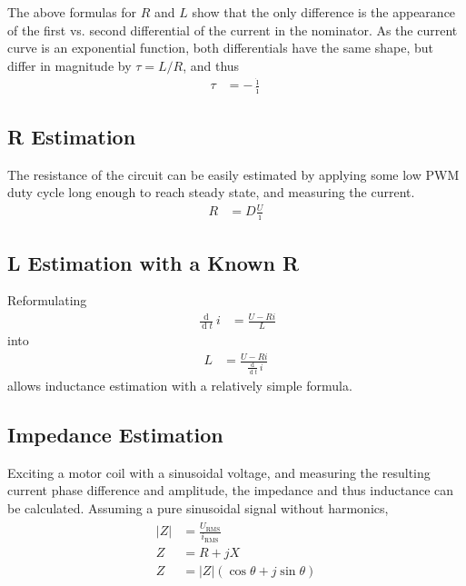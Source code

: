 \documentclass[12pt,a4paper,oneside,openany]{article}
\DeclareMathOperator{\ud}{d}
\begin{document}
The above formulas for $R$ and $L$ show that the only difference is the appearance of the first vs. second differential of the current in the nominator. As the current curve is an exponential function, both differentials have the same shape, but differ in magnitude by $\tau=L/R$, and thus 
\begin{align}
\tau &= - \frac{\dot{\imath}}{\ddot{\imath}}
\end{align}

\subsection{R Estimation}

The resistance of the circuit can be easily estimated by applying some low PWM duty cycle long enough to reach steady state, and measuring the current.
\begin{align}
R &= D\frac{U}{\imath}
\end{align}

\subsection{L Estimation with a Known R}

Reformulating
\begin{align}
\frac{\ud}{\ud t} i &= \frac{U - R i}{L}
\end{align}
into
\begin{align}
L &= \frac{U - R i}{\frac{\ud}{\ud t} i}
\end{align}
allows inductance estimation with a relatively simple formula.

\subsection{Impedance Estimation}

Exciting a motor coil with a sinusoidal voltage, and measuring the resulting current phase difference and amplitude, the impedance and thus inductance can be calculated. Assuming a pure sinusoidal signal without harmonics,
\begin{gather}
\begin{aligned}
|Z| &= \frac{U_{\textrm{RMS}}}{i_{\textrm{RMS}}} \\
Z &= R + j X \\
Z &= |Z| \left(\cos \theta + j \sin \theta \right)
\end{aligned}
\end{gather}
\end{document}

